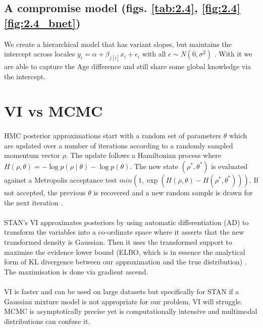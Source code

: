 \documentclass[11pt,a4paper,titlepage]{article}
\begin{document}
  

  \subsection{A compromise model (figs. \ref{tab:2.4}, \ref{fig:2.4} \ref{fig:2.4_bnet})}
  We create a hierarchical model \parencite{MultilevelHM} that has variant slopes, but maintains the intercept across locales \(y_i = \alpha + \beta_{j[i]} x_i + \epsilon_i \) with all \(\epsilon \sim N(0,\sigma^{2})\) \parencite{VaryingAlpha}. With it we are able to capture the Age difference and still share some global knowledge via the intercept.

\section{VI vs MCMC}
\paragraph{}
HMC posterior approximations start with a random set of parameters \(\theta\) which are updated over a number of iterations according to a randomly sampled momentum vector \(\rho\). The update follows a Hamiltonian process where \(H(\rho,\theta) = -\log p(\rho \mid \theta) - \log p(\theta)\). The new state \((\rho^*,\theta^*)\) is evaluated against a Metropolis acceptance test \(min(1, \exp(H(\rho,\theta)-H(\rho^*,\theta^*)))\). If not accepted, the previous \(\theta\) is recovered and a new random sample is drawn for the next iteration \parencite{betancourt2015hamiltonian}.
\paragraph{}
STAN's VI approximates posteriors by using automatic differentiation (AD) to transform the variables into a co-ordinate space where it asserts that the new transformed density is Gaussian. Then it uses the transformed support to maximise the evidence lower bound (ELBO, which is in essence the analytical form of KL divergence between our approximation and the true distribution) \parencite{ADVISTAN}. The maximisation is done via gradient ascend.
\paragraph{}
VI is faster and can be used on large datasets but specifically for STAN if a Gaussian mixture model is not appropriate for our problem, VI will struggle. MCMC is asymptotically precise yet is computationally intensive and multimodal distributions can confuse it.
\end{document}

